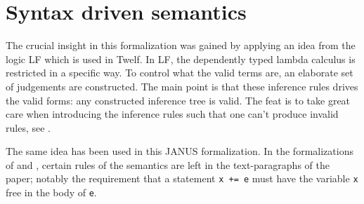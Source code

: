 \chapter{Syntax driven semantics}

The crucial insight in this formalization was gained by applying an
idea from the logic LF which is used in Twelf. In LF, the dependently
typed lambda calculus is restricted in a specific way. To control what
the valid terms are, an elaborate set of judgements are
constructed. The main point is that these inference rules drives the
valid forms: any constructed inference tree is valid. The feat is to
take great care when introducing the inference rules such that one
can't produce invalid rules, see \cite{harper+07:mechanizing}.

The same idea has been used in this JANUS formalization. In the
formalizations of \cite{glueck2007} and \cite{glueck2008}, certain rules
of the semantics are left in the text-paragraphs of the paper; notably
the requirement that a statement \texttt{x += e} must have the
variable \texttt{x} free in the body of \texttt{e}.


